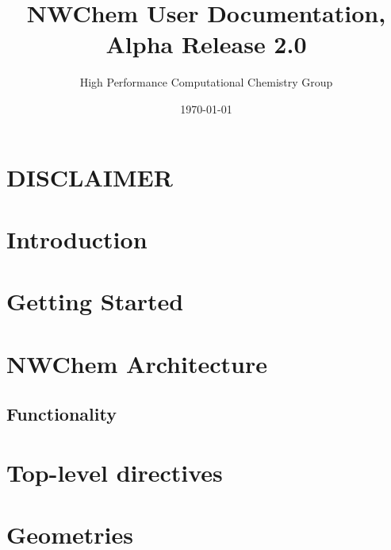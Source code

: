 
\setlength{\parskip}{6pt}

\newcommand{\nwchemversion}{2.0}
\newcommand{\nwchemyear}{1996}

\newcommand{\angstrom}{{\AA}ngstr{\o}m}





\title{\bf\Large NWChem User Documentation, Alpha Release \nwchemversion}
\author{High Performance Computational Chemistry Group}
\date{\today}
\maketitle

\section*{\center DISCLAIMER}


\clearpage

\tableofcontents

\clearpage

\section{Introduction}


\section{Getting Started}


\section{NWChem Architecture}


\subsection{Functionality}


\section{Top-level directives}


\section{Geometries}


